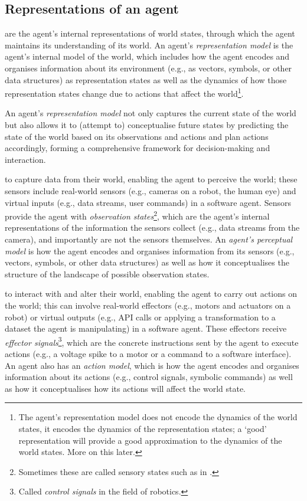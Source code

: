 \subsection{Representations of an agent}

 are the agent's internal representations of world states, through which the agent maintains its understanding of its world.
An agent's \emph{representation model} is the agent's internal model of the world, which includes how the agent encodes and organises information about its environment (e.g., as vectors, symbols, or other data structures) as representation states as well as the dynamics of how those representation states change due to actions that affect the world\footnote{The agent's representation model does not encode the dynamics of the world states, it encodes the dynamics of the representation states; a `good' representation will provide a good approximation to the dynamics of the world states. More on this later.}.

An agent's \emph{representation model} not only captures the current state of the world but also allows it to (attempt to) conceptualise future states by predicting the state of the world based on its observations and actions and plan actions accordingly, forming a comprehensive framework for decision-making and interaction.

 to capture data from their world, enabling the agent to perceive the world; these sensors include real-world sensors (e.g., cameras on a robot, the human eye) and virtual inputs (e.g., data streams, user commands) in a software agent.
Sensors provide the agent with \emph{observation states}\footnote{Sometimes these are called sensory states such as in \cite{Ramstead2020}.}, which are the agent's internal representations of the information the sensors collect (e.g., data streams from the camera), and importantly are not the sensors themselves.
An \emph{agent's perceptual model} is how the agent encodes and organises information from its sensors (e.g., vectors, symbols, or other data structures) as well as how it conceptualises the structure of the landscape of possible observation states.

 to interact with and alter their world, enabling the agent to carry out actions on the world; this can involve real-world effectors (e.g., motors and actuators on a robot) or virtual outputs (e.g., API calls or applying a transformation to a dataset the agent is manipulating) in a software agent.
These effectors receive \emph{effector signals}\footnote{Called \emph{control signals} in the field of robotics.}, which are the concrete instructions sent by the agent to execute actions (e.g., a voltage spike to a motor or a command to a software interface).
An agent also has an \emph{action model}, which is how the agent encodes and organises information about its actions (e.g., control signals, symbolic commands) as well as how it conceptualises how its actions will affect the world state.

